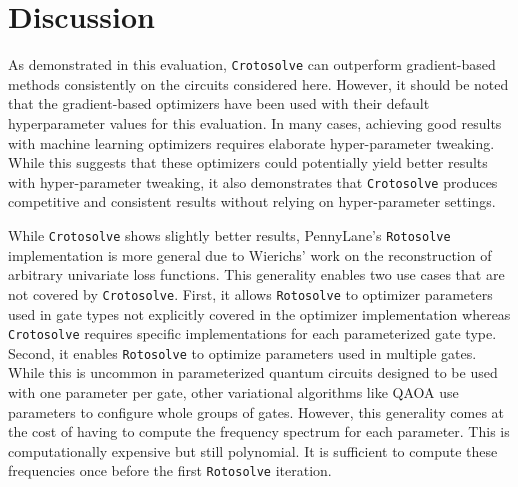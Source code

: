 \section{Discussion}
\label{sec:evaluation-discussion}

As demonstrated in this evaluation, \texttt{Crotosolve} can outperform
gradient-based methods consistently on the circuits considered here.
However, it should be noted that the gradient-based optimizers have been used
with their default hyperparameter values for this evaluation.
In many cases, achieving good results with machine learning optimizers requires
elaborate hyper-parameter tweaking.
While this suggests that these optimizers could potentially yield better results
with hyper-parameter tweaking, it also demonstrates that \texttt{Crotosolve}
produces competitive and consistent results without relying on hyper-parameter
settings.

While \texttt{Crotosolve} shows slightly better results, PennyLane's
\texttt{Rotosolve} implementation is more general due to Wierichs' work on the
reconstruction of arbitrary univariate loss functions.
This generality enables two use cases that are not covered by \texttt{Crotosolve}.
First, it allows \texttt{Rotosolve} to optimizer parameters used in gate types
not explicitly covered in the optimizer implementation whereas
\texttt{Crotosolve} requires specific implementations for each parameterized
gate type.
Second, it enables \texttt{Rotosolve} to optimize parameters used in multiple
gates.
While this is uncommon in parameterized quantum circuits designed to be used
with one parameter per gate, other variational algorithms like QAOA use
parameters to configure whole groups of gates.
However, this generality comes at the cost of having to compute the frequency
spectrum for each parameter.
This is computationally expensive but still polynomial.
It is sufficient to compute these frequencies once before the first
\texttt{Rotosolve} iteration.
